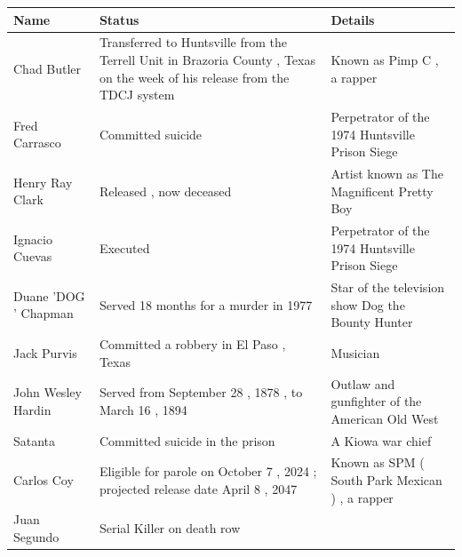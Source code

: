\documentclass{article}
\begin{document}
\begin{tabular}{lll}
\toprule
Name & Status & Details \\
\midrule
Chad Butler & Transferred to Huntsville from the Terrell Unit in Brazoria County , Texas on the week of his release from the TDCJ system & Known as Pimp C , a rapper \\
Fred Carrasco & Committed suicide & Perpetrator of the 1974 Huntsville Prison Siege \\
Henry Ray Clark & Released , now deceased & Artist known as The Magnificent Pretty Boy \\
Ignacio Cuevas & Executed & Perpetrator of the 1974 Huntsville Prison Siege \\
Duane 'DOG ' Chapman & Served 18 months for a murder in 1977 & Star of the television show Dog the Bounty Hunter \\
Jack Purvis & Committed a robbery in El Paso , Texas & Musician \\
John Wesley Hardin & Served from September 28 , 1878 , to March 16 , 1894 & Outlaw and gunfighter of the American Old West \\
Satanta & Committed suicide in the prison & A Kiowa war chief \\
Carlos Coy & Eligible for parole on October 7 , 2024 ; projected release date April 8 , 2047 & Known as SPM ( South Park Mexican ) , a rapper \\
Juan Segundo & Serial Killer on death row &  \\
\bottomrule
\end{tabular}
\end{document}
